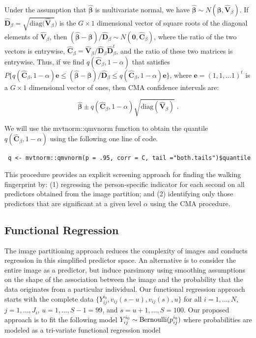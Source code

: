 Under the assumption that $\widehat{\boldsymbol{\beta}}$ is multivariate normal, we have $ \widehat{\boldsymbol{\beta}} \sim N(\boldsymbol{\beta}, \widehat{\mathbf{V}}_\beta)$. If
$\widehat{\mathbf{D}}_\beta = \sqrt{\text{diag}(\widehat{\mathbf{V}}_\beta})$ is the $G\times 1$ dimensional vector of square roots of the diagonal elements of $\widehat{\mathbf{V}}_\beta$, then 
 $(\widehat{\boldsymbol{\beta}}-\boldsymbol{\beta})/\widehat{\mathbf{D}}_\beta \sim N(\mathbf{0}, \widehat{\mathbf{C}}_\beta)$,
where the ratio of the two vectors is entrywise, $\widehat{\mathbf{C}}_\beta = \widehat{\mathbf{V}}_\beta/\widehat{\mathbf{D}}_\beta \widehat{\mathbf{D}}_\beta^t$, and the ratio of these two matrices is entrywise. Thus, if we find $q(\widehat{\mathbf{C}}_\beta, 1-\alpha)$ that satisfies 
$P\{q(\widehat{\mathbf{C}}_\beta, 1-\alpha)\mathbf{e} \leq (\widehat{\boldsymbol{\beta}}-\boldsymbol{\beta})/{\widehat{\mathbf{D}}_\beta}  \leq q(\widehat{\mathbf{C}}_\beta, 1-\alpha)\mathbf{e}\}$,
where $\mathbf{e} = (1, 1, \dots 1)^t$ is a $G\times 1$ dimensional vector of ones, then CMA confidence intervals are: 

$$ \widehat{\boldsymbol{\beta}} \pm q(\widehat{\mathbf{C}}_\beta, 1-\alpha)\sqrt{\text{diag}(\widehat{\mathbf{V}}_\beta)}\;.$$

We will use the {\ttfamily mvtnorm::qmvnorm} \cite{mvtnorm} function to obtain the quantile $q(\widehat{\mathbf{C}}_\beta, 1-\alpha)$ using the following one line of code. 
\begin{verbatim} 
 q <- mvtnorm::qmvnorm(p = .95, corr = C, tail ="both.tails")$quantile
\end{verbatim}

This procedure provides an explicit screening approach for finding the walking fingerprint by: (1) regressing the person-specific indicator for each second on all predictors obtained from the image partition; and (2) identifying only those predictors that are significant at a given level $\alpha$ using the CMA procedure.

\subsection{Functional Regression}\label{subsec:functional_regression}
The image partitioning approach reduces the complexity of images and conducts regression in this simplified predictor space. An alternative is to consider the entire image as a predictor, but induce parsimony using smoothing assumptions on the shape of the association between  the image and the probability that the data originates from a particular individual. 
Our functional regression approach starts with the complete data $\{Y_{ij}^{i_0},v_{ij}(s-u),v_{ij}(s),u\}$ for all $i=1,\ldots,N$, $j=1,\ldots, J_i$, $u=1,\ldots,S-1=99$, and $s=u+1,\ldots,S=100$.  Our proposed approach is to fit the following model $Y_{ij}^{i_0}\sim {\rm Bernoulli} (p_{ij}^{i_0})$ where probabilities are modeled as a tri-variate functional regression model


